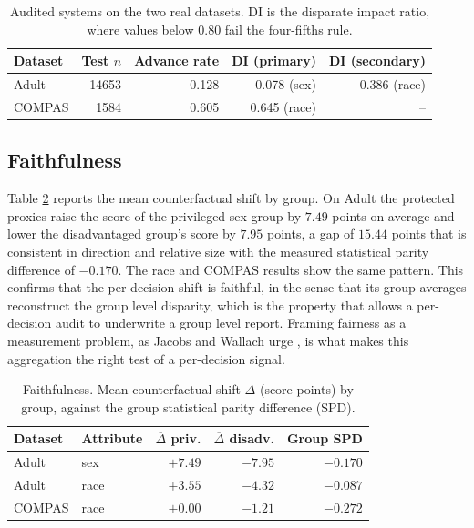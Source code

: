 \documentclass[conference]{IEEEtran}
\begin{document}
\begin{table}[t]
\caption{Audited systems on the two real datasets. DI is the disparate impact ratio,
where values below 0.80 fail the four-fifths rule.}
\label{tab:datasets}
\centering
\footnotesize
\begin{tabular}{@{}lrrrr@{}}
\toprule
Dataset & Test $n$ & Advance rate & DI (primary) & DI (secondary) \\
\midrule
Adult   & 14653 & 0.128 & 0.078 (sex) & 0.386 (race) \\
COMPAS  & 1584  & 0.605 & 0.645 (race) & -- \\
\bottomrule
\end{tabular}
\end{table}

\subsection{Faithfulness}
Table \ref{tab:faithful} reports the mean counterfactual shift by group. On Adult the
protected proxies raise the score of the privileged sex group by $7.49$ points on
average and lower the disadvantaged group's score by $7.95$ points, a gap of $15.44$
points that is consistent in direction and relative size with the measured
statistical parity difference of $-0.170$. The race and COMPAS results show the same
pattern. This confirms that the per-decision shift is faithful, in the sense that its
group averages reconstruct the group level disparity, which is the property that
allows a per-decision audit to underwrite a group level report. Framing fairness as a measurement problem, as Jacobs and Wallach urge \cite{jacobs}, is what makes this aggregation the right test of a per-decision signal.

\begin{table}[t]
\caption{Faithfulness. Mean counterfactual shift $\Delta$ (score points) by group,
against the group statistical parity difference (SPD).}
\label{tab:faithful}
\centering
\footnotesize
\begin{tabular}{@{}llrrr@{}}
\toprule
Dataset & Attribute & $\overline{\Delta}$ priv. & $\overline{\Delta}$ disadv. & Group SPD \\
\midrule
Adult  & sex  & $+7.49$ & $-7.95$ & $-0.170$ \\
Adult  & race & $+3.55$ & $-4.32$ & $-0.087$ \\
COMPAS & race & $+0.00$ & $-1.21$ & $-0.272$ \\
\bottomrule
\end{tabular}
\end{table}
\end{document}
